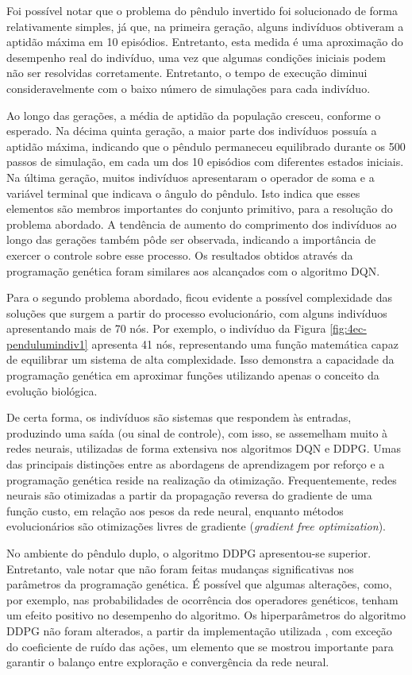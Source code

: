 Foi possível notar que o problema do pêndulo invertido foi solucionado de forma relativamente simples, já que, na primeira geração, alguns indivíduos obtiveram a aptidão máxima em 10 episódios. Entretanto, esta medida é uma aproximação do desempenho real do indivíduo, uma vez que algumas condições iniciais podem não ser resolvidas corretamente. Entretanto, o tempo de execução diminui consideravelmente com o baixo número de simulações para cada indivíduo.

Ao longo das gerações, a média de aptidão da população cresceu, conforme o esperado. Na décima quinta geração, a maior parte dos indivíduos possuía a aptidão máxima, indicando que o pêndulo permaneceu equilibrado durante os 500 passos de simulação, em cada um dos 10 episódios com diferentes estados iniciais. Na última geração, muitos indivíduos apresentaram o operador de soma e a variável terminal que indicava o ângulo do pêndulo. Isto indica que esses elementos são membros importantes do conjunto primitivo, para a resolução do problema abordado. A tendência de aumento do comprimento dos indivíduos ao longo das gerações também pôde ser observada, indicando a importância de exercer o controle sobre esse processo. Os resultados obtidos através da programação genética foram similares aos alcançados com o algoritmo DQN.

Para o segundo problema abordado, ficou evidente a possível complexidade das soluções que surgem a partir do processo evolucionário, com alguns indivíduos apresentando mais de 70 nós. Por exemplo, o indivíduo da Figura \ref{fig:4ec-pendulumindiv1} apresenta 41 nós, representando uma função matemática capaz de equilibrar um sistema de alta complexidade. Isso demonstra a capacidade da programação genética em aproximar funções utilizando apenas o conceito da evolução biológica.

De certa forma, os indivíduos são sistemas que respondem às entradas, produzindo uma saída (ou sinal de controle), com isso, se assemelham muito à redes neurais, utilizadas de forma extensiva nos algoritmos DQN e DDPG. Umas das principais distinções entre as abordagens de aprendizagem por reforço e a programação genética reside na realização da otimização. Frequentemente, redes neurais são otimizadas a partir da propagação reversa do gradiente de uma função custo, em relação aos pesos da rede neural, enquanto métodos evolucionários são otimizações livres de gradiente (\textit{gradient free optimization}).

No ambiente do pêndulo duplo, o algoritmo DDPG apresentou-se superior. Entretanto, vale notar que não foram feitas mudanças significativas nos parâmetros da programação genética. É possível que algumas alterações, como, por exemplo, nas probabilidades de ocorrência dos operadores genéticos, tenham um efeito positivo no desempenho do algoritmo. Os hiperparâmetros do algoritmo DDPG não foram alterados, a partir da implementação utilizada \cite{stable-baselines}, com exceção do coeficiente de ruído das ações, um elemento que se mostrou importante para garantir o balanço entre exploração e convergência da rede neural.

